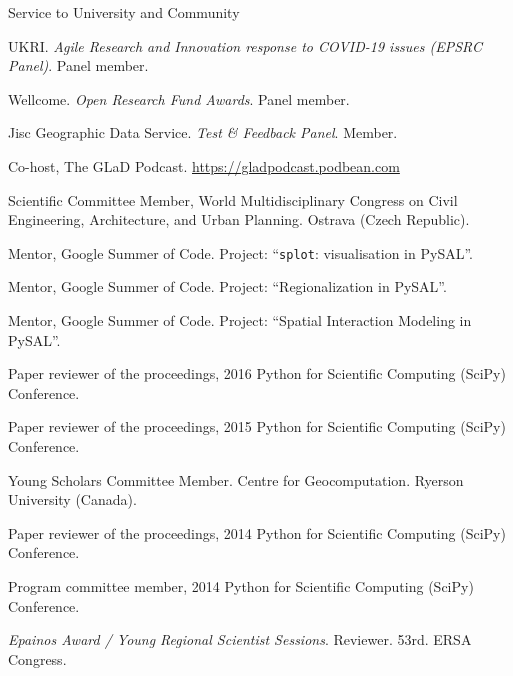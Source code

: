 \documentclass[12pt,2up]{article}
\begin{document}
\begin{cv}{}
\begin{cvlist}{Service to University and Community}
\item[2021] UKRI. \textit{Agile Research and Innovation response to COVID-19 issues
    (EPSRC Panel)}. Panel member.
\item[2019] Wellcome. \textit{Open Research Fund Awards}. Panel member.
\item[2018] Jisc Geographic Data Service. \textit{Test \& Feedback Panel}. Member.

\item[\textbf{Other}]

\item[2023-] Co-host, The GLaD Podcast. \url{https://gladpodcast.podbean.com}
\item[2024] Scientific Committee Member, World Multidisciplinary Congress on
        Civil Engineering, Architecture, and Urban Planning. Ostrava (Czech
        Republic).
\item[2018] Mentor, Google Summer of Code. Project: ``\texttt{splot}:
    visualisation in PySAL''.
\item[2017] Mentor, Google Summer of Code. Project: ``Regionalization in PySAL''.
\item[2016] Mentor, Google Summer of Code. Project: ``Spatial Interaction
    Modeling in PySAL''.
\item[] Paper reviewer of the proceedings, 2016 Python for Scientific Computing
    (SciPy) Conference.
\item[2015] Paper reviewer of the proceedings, 2015 Python for Scientific Computing
    (SciPy) Conference.
\item[2014-] Young Scholars Committee Member. Centre for Geocomputation. Ryerson
    University (Canada).
\item[] Paper reviewer of the proceedings, 2014 Python for Scientific Computing
    (SciPy) Conference.
\item[] Program committee member, 2014 Python for Scientific Computing
    (SciPy) Conference.
 \item[2013]  \emph{Epainos Award / Young Regional Scientist Sessions}. Reviewer.
     53rd. ERSA Congress.
  \end{cvlist}


\end{cv}
\end{document}
